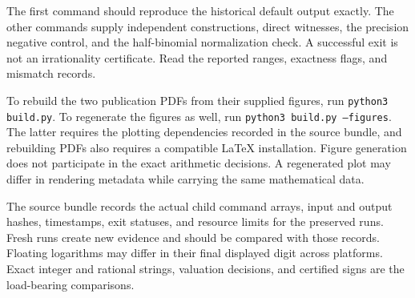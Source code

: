 The first command should reproduce the historical default output exactly. The other commands supply independent constructions, direct witnesses, the precision negative control, and the half-binomial normalization check. A successful exit is not an irrationality certificate. Read the reported ranges, exactness flags, and mismatch records.

To rebuild the two publication PDFs from their supplied figures, run \texttt{python3 build.py}. To regenerate the figures as well, run \texttt{python3 build.py --figures}. The latter requires the plotting dependencies recorded in the source bundle, and rebuilding PDFs also requires a compatible LaTeX installation. Figure generation does not participate in the exact arithmetic decisions. A regenerated plot may differ in rendering metadata while carrying the same mathematical data.

The source bundle records the actual child command arrays, input and output hashes, timestamps, exit statuses, and resource limits for the preserved runs. Fresh runs create new evidence and should be compared with those records. Floating logarithms may differ in their final displayed digit across platforms. Exact integer and rational strings, valuation decisions, and certified signs are the load-bearing comparisons.

